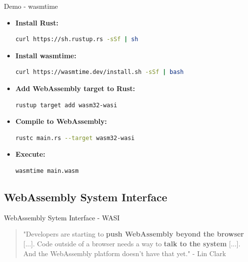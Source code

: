 \documentclass{beamer}
\begin{document}
\begin{frame}[fragile]{Demo - wasmtime}
\begin{itemize}
    \item
    \textbf{Install Rust:}
    \begin{lstlisting}[language=bash,basicstyle=\scriptsize]
curl https://sh.rustup.rs -sSf | sh
    \end{lstlisting}
    \item
    \textbf{Install wasmtime:}
    \begin{lstlisting}[language=bash,basicstyle=\scriptsize]
curl https://wasmtime.dev/install.sh -sSf | bash
    \end{lstlisting}
    \item
    \textbf{Add WebAssembly target to Rust:}
    \begin{lstlisting}[language=bash,basicstyle=\scriptsize]
rustup target add wasm32-wasi
    \end{lstlisting}
    \item
    \textbf{Compile to WebAssembly:}
    \begin{lstlisting}[language=bash,basicstyle=\scriptsize]
rustc main.rs --target wasm32-wasi
    \end{lstlisting}
    \item
    \textbf{Execute:}
    \begin{lstlisting}[language=bash,basicstyle=\scriptsize]
wasmtime main.wasm
    \end{lstlisting}
\end{itemize}
\end{frame}

\subsection{WebAssembly System Interface}

\begin{frame}{WebAssembly Sytem Interface - WASI}
    \begin{quotation}
        "Developers are starting to \textbf{push WebAssembly beyond the browser} [...]. Code outside of a browser needs a way to \textbf{talk to the system} [...]. And the WebAssembly platform doesn’t have that yet." - Lin Clark
    \end{quotation}
\end{frame}
\end{document}
